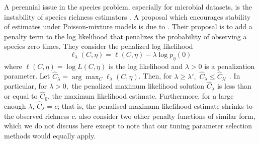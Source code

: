 \documentclass[oupdraft]{bio}
\begin{document}
A perennial issue in the species problem, especially for microbial datasets, is the instability of species richness estimators \citep{Rocchetti:2011tv,willis_2015}.
%
%
%
A proposal which encourages stability of estimates under Poisson-mixture models is due to \citet{wang_2005}.  Their proposal is to add a penalty term to the log likelihood that penalizes the probability of observing a species zero times. They consider the
penalized log likelihood
\begin{equation}
\ell_\lambda(C, \eta) = \ell(C,\eta) - \lambda \log p_{\eta}(0)
\label{eq:wang_lindsay}
\end{equation}
where $\ell(C,\eta) = \log L(C, \eta)$ is the log likelihood and $\lambda > 0$ is a penalization parameter.
Let $\hat{C}_\lambda = \arg \max_{C} \ell_\lambda(C, \eta)$.
Then, for $\lambda \geq \lambda',$ $\hat{C}_\lambda \leq \hat{C}_{\lambda'}$ \citep[Theorem 1]{wang_2005}. In particular, for $\lambda > 0,$ the penalized maximum likelihood solution $\hat{C}_\lambda$ is less than or equal to $\hat{C}_0$, the maximum likelihood estimate. Furthermore, for a large enough $\lambda$, $\hat{C}_\lambda = c$; that is, the penalised maximum likelihood estimate shrinks to the observed richness $c$.
\citet{wang_2005} also consider two other penalty functions of similar form, which we do not discuss here except to note that our tuning parameter selection methods would equally apply.
\end{document}
